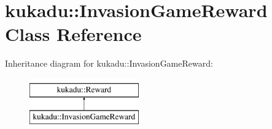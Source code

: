 \hypertarget{classkukadu_1_1InvasionGameReward}{\section{kukadu\-:\-:Invasion\-Game\-Reward Class Reference}
\label{classkukadu_1_1InvasionGameReward}
}
Inheritance diagram for kukadu\-:\-:Invasion\-Game\-Reward\-:\begin{figure}[H]
\begin{center}
\leavevmode
\includegraphics[height=2.000000cm]{classkukadu_1_1InvasionGameReward}
\end{center}
\end{figure}
